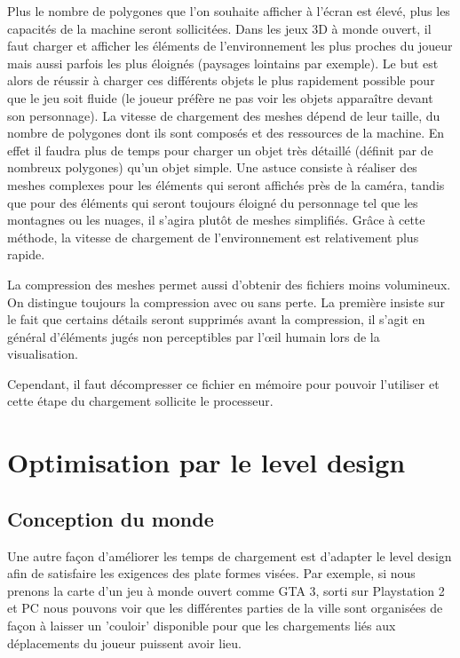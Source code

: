\documentclass[a4paper, 11pt]{article} %
\begin{document}
Plus le nombre de polygones que l'on souhaite afficher à l'écran est élevé, plus les capacités de la machine seront sollicitées. Dans les jeux 3D à monde ouvert, il faut charger et afficher les éléments de l'environnement les plus proches du joueur mais aussi parfois les plus éloignés (paysages lointains par exemple). Le but est alors de réussir à charger ces différents objets le plus rapidement possible pour que le jeu soit fluide (le joueur préfère ne pas voir les objets apparaître devant son personnage). La vitesse de chargement des meshes dépend de leur taille, du nombre de polygones dont ils sont composés et des ressources de la machine. En effet il faudra plus de temps pour charger un objet très détaillé (définit par de nombreux polygones) qu'un objet simple. Une astuce consiste à réaliser des meshes complexes pour les éléments qui seront affichés près de la caméra, tandis que pour des éléments qui seront toujours éloigné du personnage tel que les montagnes ou les nuages, il s'agira plutôt de meshes simplifiés. Grâce à cette méthode, la vitesse de chargement de l'environnement est relativement plus rapide.

La compression des meshes permet aussi d'obtenir des fichiers moins volumineux. On distingue toujours la compression avec ou sans perte. La première insiste sur le fait que certains détails seront supprimés avant la compression, il s'agit en général d'éléments jugés non perceptibles par l’œil humain lors de la visualisation. %

Cependant, il faut décompresser ce fichier en mémoire pour pouvoir l'utiliser et cette étape du chargement sollicite le processeur.


\newpage
\section*{Optimisation par le level design}
\subsection*{Conception du monde}
Une autre façon d'améliorer les temps de chargement est d'adapter le level design afin de satisfaire les exigences des plate formes visées. Par exemple, si nous prenons la carte d'un jeu à monde ouvert comme GTA 3, sorti sur Playstation 2 et PC nous pouvons voir que les différentes parties de la ville sont organisées de façon à laisser un 'couloir' disponible pour que les chargements liés aux déplacements du joueur puissent avoir lieu.
\end{document}
